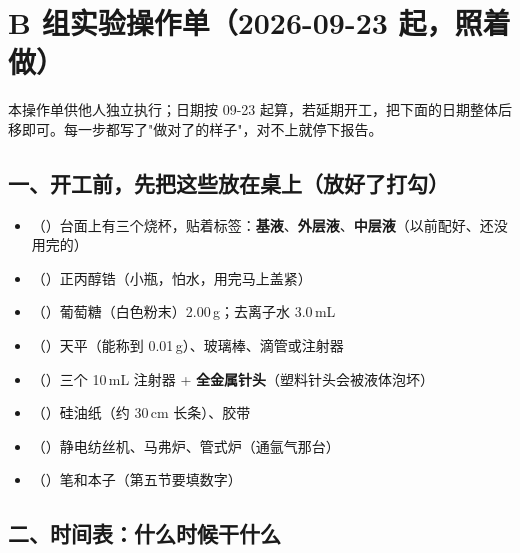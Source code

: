 
\section{B 组实验操作单（2026-09-23 起，照着做）}
\label{sec:Bop}

{\small 本操作单供他人独立执行；日期按 09-23 起算，若延期开工，把下面的日期整体后移即可。每一步都写了"做对了的样子"，对不上就停下报告。}

\subsection*{一、开工前，先把这些放在桌上（放好了打勾）}
\begin{itemize}
  \item （\hspace{1.2em}）台面上有三个烧杯，贴着标签：\textbf{基液}、\textbf{外层液}、\textbf{中层液}（以前配好、还没用完的）
  \item （\hspace{1.2em}）正丙醇锆（小瓶，怕水，用完马上盖紧）
  \item （\hspace{1.2em}）葡萄糖（白色粉末）2.00\,g；去离子水 3.0\,mL
  \item （\hspace{1.2em}）天平（能称到 0.01\,g）、玻璃棒、滴管或注射器
  \item （\hspace{1.2em}）三个 10\,mL 注射器 + \textbf{全金属针头}（塑料针头会被液体泡坏）
  \item （\hspace{1.2em}）硅油纸（约 30\,cm 长条）、胶带
  \item （\hspace{1.2em}）静电纺丝机、马弗炉、管式炉（通氩气那台）
  \item （\hspace{1.2em}）笔和本子（第五节要填数字）
\end{itemize}

\subsection*{二、时间表：什么时候干什么}


